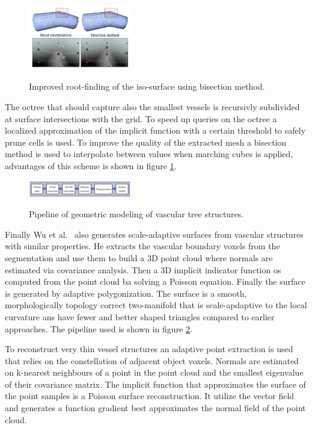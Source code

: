 \begin{figure}[h]
	\centering
	\includegraphics[width=0.4\textwidth]{./Images/BisectionMethod.png} \\
	\caption{Improved root-finding of the iso-surface using bisection method.}
	\cite{kretschmer2012reliable}
	\label{fig:BisectionMethod}
\end{figure} 

The octree that should capture also the smallest vessels is recursivly subdivided at surface intersections with the grid. To speed up queries on the octree a localized approximation of the implicit function with a certain threshold to safely prune cells is used.
To improve the quality of the extracted mesh a bisection method is used to interpolate between values when marching cubes is applied, advantages of this scheme is shown in figure \ref{fig:BisectionMethod}.

\begin{figure}[h]
	\centering
	\includegraphics[width=0.4\textwidth]{./Images/Pipeline.png} \\
	\caption{Pipeline of geometric modeling of vascular tree structures.}
	\cite{wu2010scale}
	\label{fig:Pipeline}
\end{figure} 

Finally Wu et al.~\cite{wu2010scale} also generates scale-adaptive surfaces from vascular structures with similar properties. He extracts the vascular boundary voxels from the segmentation and use them to build a 3D point cloud where normals are estimated via covariance analysis. Then a 3D implicit indicator function os computed from the point cloud ba solving a Poisson equation. Finally the surface is generated by adaptive polygonization.
The surface is a smooth, morphologically topology correct two-manifold that is scale-apdaptive to the local curvature ans have fewer and better shaped triangles compared to earlier approaches. The pipeline used is shown in figure \ref{fig:Pipeline}. 

To reconstruct very thin vessel structures an adaptive point extraction is used that relies on the constellation of adjacent object voxels. Normals are estimated on k-nearest neighbours of a point in the point cloud and the smallest eigenvalue of their covariance matrix. The implicit function that approximates the surface of the point samples is a Poisson surface reconstruction. It utilize the vector field and generates a function gradient best approximates the normal field of the point cloud.

